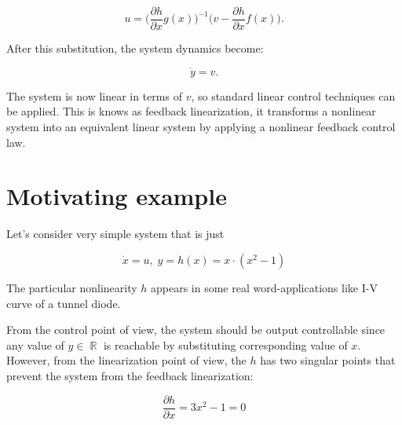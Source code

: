 \documentclass[11pt,american]{article}
\DeclareMathOperator{\R}{\mathbb{R}}
\begin{document}
\begin{equation}
u = \big(\frac{\partial h}{\partial x} g(x)\big)^{-1} \big(v - \frac{\partial h}{\partial x} f(x)\big).
\end{equation}

After this substitution, the system dynamics become:

\begin{equation}
\dot{y} = v.
\end{equation}

The system is now linear in terms of \( v \), so standard linear control techniques can be applied.
This is knows as feedback linearization, it transforms a nonlinear system into an equivalent linear system by applying a nonlinear feedback control law.

\section{Motivating example}

Let's consider very simple system that is just 

\begin{equation}\label{toy_example}
\dot x = u, \; y = h(x) = x \cdot (x^2 - 1)
\end{equation}


The particular nonlinearity $h$ appears in some real word-applications like I-V curve of a tunnel diode.

From the control point of view, the system should be output controllable since any value of $y \in \R$ is reachable by substituting corresponding value of $x$.
However, from the linearization point of view, the $h$ has two singular points that prevent the system from the feedback linearization:

\begin{equation}
\frac{\partial h}{\partial x} = 3 x^2 - 1 = 0 
\end{equation}
\end{document}
